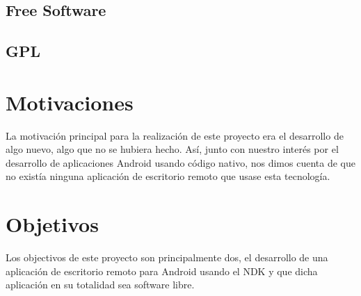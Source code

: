 \subsection{Free Software}

\subsection{GPL}

\section{Motivaciones}

La motivación principal para la realización de este proyecto era el desarrollo de algo nuevo, algo que no se hubiera hecho. Así, junto con nuestro interés por el desarrollo de aplicaciones Android usando código nativo, nos dimos cuenta de que no existía ninguna aplicación de escritorio remoto que usase esta tecnología.\\

\section{Objetivos}

Los objectivos de este proyecto son principalmente dos, el desarrollo de una aplicación de escritorio remoto para Android usando el NDK y que dicha aplicación en su totalidad sea software libre.
